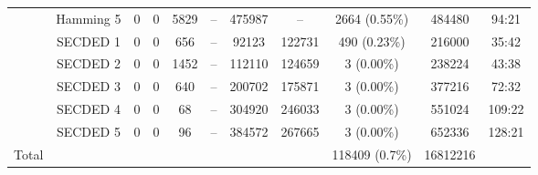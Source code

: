 \begin{table}[H]
\begin{tabular}{@{}ccccccccccc@{}}
                                                           & Hamming 5     & 0     & 0            & 5829        & --          & \num{475987}                             & --                                      & 2664 {\tiny (0.55\%)}        & \num{484480}   & 94:21                           \\
                                                           & SECDED 1      & 0     & 0            & 656         & --          & \num{92123 }                             & \num{122731}                            & 490 {\tiny (0.23\%)}         & \num{216000}   & 35:42                           \\
                                                           & SECDED 2      & 0     & 0            & 1452        & --          & \num{112110}                             & \num{124659}                            & 3 {\tiny (0.00\%)}           & \num{238224}   & 43:38                           \\
                                                           & SECDED 3      & 0     & 0            & 640         & --          & \num{200702}                             & \num{175871}                            & 3 {\tiny (0.00\%)}           & \num{377216}   & 72:32                           \\
                                                           & SECDED 4      & 0     & 0            & 68          & --          & \num{304920}                             & \num{246033}                            & 3 {\tiny (0.00\%)}           & \num{551024}   & 109:22                          \\
                                                           & SECDED 5      & 0     & 0            & 96          & --          & \num{384572}                             & \num{267665}                            & 3 {\tiny (0.00\%)}           & \num{652336}   & 128:21                          \\\midrule
        Total                                              &               &       &              &             &             &                                          &                                         & \num{118409} {\tiny (0.7\%)} & \num{16812216} &                                 \\
        \bottomrule
    \end{tabular}
\end{table}

